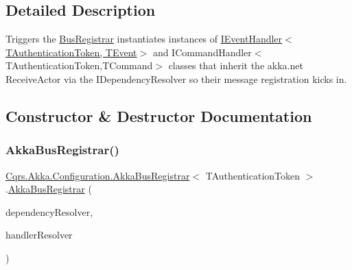 \subsection{Detailed Description}
Triggers the \hyperlink{classCqrs_1_1Configuration_1_1BusRegistrar_a4a934d21a535b28af6c67154512bba20_a4a934d21a535b28af6c67154512bba20}{Bus\+Registrar} instantiates instances of \hyperlink{interfaceCqrs_1_1Events_1_1IEventHandler}{I\+Event\+Handler$<$\+T\+Authentication\+Token, T\+Event$>$} and I\+Command\+Handler$<$\+T\+Authentication\+Token,\+T\+Command$>$ classes that inherit the akka.\+net Receive\+Actor via the I\+Dependency\+Resolver so their message registration kicks in. 



\subsection{Constructor \& Destructor Documentation}
\mbox{\label{classCqrs_1_1Akka_1_1Configuration_1_1AkkaBusRegistrar_a49ab48e3305b6eb17f2a68fc2996a988_a49ab48e3305b6eb17f2a68fc2996a988}} 
\subsubsection{\texorpdfstring{Akka\+Bus\+Registrar()}{AkkaBusRegistrar()}}
{\footnotesize\ttfamily \hyperlink{classCqrs_1_1Akka_1_1Configuration_1_1AkkaBusRegistrar}{Cqrs.\+Akka.\+Configuration.\+Akka\+Bus\+Registrar}$<$ T\+Authentication\+Token $>$.\hyperlink{classCqrs_1_1Akka_1_1Configuration_1_1AkkaBusRegistrar}{Akka\+Bus\+Registrar} (\begin{DoxyParamCaption}\item[{\hyperlink{interfaceCqrs_1_1Configuration_1_1IDependencyResolver}{I\+Dependency\+Resolver}}]{dependency\+Resolver,  }\item[{\hyperlink{interfaceCqrs_1_1Akka_1_1Configuration_1_1IHandlerResolver}{I\+Handler\+Resolver}}]{handler\+Resolver }\end{DoxyParamCaption})}



